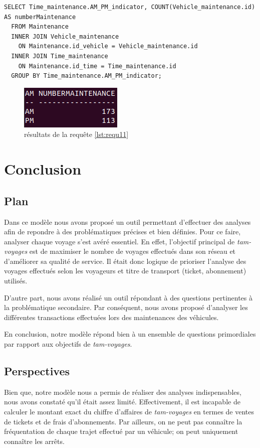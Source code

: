 \documentclass[a4paper,12pt]{report}
\begin{document}
\newpage

\begin{lstlisting}[caption={le nombre de véhicules maintenus le matin, et ceux maintenus l'après midi}, label={lst:requ11}]
  SELECT Time_maintenance.AM_PM_indicator, COUNT(Vehicle_maintenance.id) AS numberMaintenance
  FROM Maintenance
  INNER JOIN Vehicle_maintenance
    ON Maintenance.id_vehicle = Vehicle_maintenance.id
  INNER JOIN Time_maintenance
    ON Maintenance.id_time = Time_maintenance.id
  GROUP BY Time_maintenance.AM_PM_indicator;
\end{lstlisting}

\begin{figure}[!ht]
  \centering
  \includegraphics[scale=0.5]{images/requetes_analytiques/requ11.png}
  \caption{résultats de la requête \ref{lst:requ11}}
\end{figure}

\chapter{Conclusion}
\section{Plan}
Dans ce modèle nous avons proposé un outil permettant d'effectuer des analyses afin de repondre à des problématiques précises et bien définies.
Pour ce faire, analyser chaque voyage s'est avéré essentiel. En effet, l'objectif principal de \textit{tam-voyages} est de maximiser le nombre de voyages effectués dans son réseau et d'améliorer sa qualité de service. Il était donc logique de prioriser l'analyse des voyages effectués selon les voyageurs et titre de transport (ticket, abonnement) utilisés.

D'autre part, nous avons réalisé un outil répondant à des questions pertinentes à la problématique secondaire. Par conséquent, nous avons proposé d'analyser les différentes transactions effectuées lors des maintenances des véhicules.

En conclusion, notre modèle répond bien à un ensemble de questions primordiales par rapport aux objectifs de \textit{tam-voyages}.

\section{Perspectives}
Bien que, notre modèle nous a permis de réaliser des analyses indispensables, nous avons constaté qu'il était assez limité. Effectivement, il est incapable de calculer le montant exact du chiffre d'affaires de \textit{tam-voyages} en termes de ventes de tickets et de frais d'abonnements. Par ailleurs, on ne peut pas connaître la fréquentation de chaque trajet effectué par un véhicule; on peut uniquement connaître les arrêts.
\end{document}
